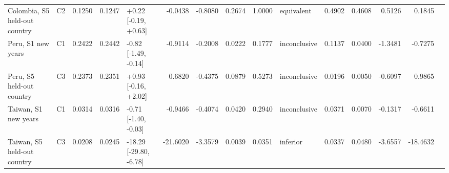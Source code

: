 \begin{tabular}{llrrlrrrrlrrrrr}
Colombia, S5 held-out country & C2 & 0.1250 & 0.1247 & +0.22 [-0.19, +0.63] & -0.0438 & -0.8080 & 0.2674 & 1.0000 & equivalent & 0.4902 & 0.4608 & 0.5126 & 0.1845 &  \\
Peru, S1 new years & C1 & 0.2422 & 0.2442 & -0.82 [-1.49, -0.14] & -0.9114 & -0.2008 & 0.0222 & 0.1777 & inconclusive & 0.1137 & 0.0400 & -1.3481 & -0.7275 &  \\
Peru, S5 held-out country & C3 & 0.2373 & 0.2351 & +0.93 [-0.16, +2.02] & 0.6820 & -0.4375 & 0.0879 & 0.5273 & inconclusive & 0.0196 & 0.0050 & -0.6097 & 0.9865 &  \\
Taiwan, S1 new years & C1 & 0.0314 & 0.0316 & -0.71 [-1.40, -0.03] & -0.9466 & -0.4074 & 0.0420 & 0.2940 & inconclusive & 0.0371 & 0.0070 & -0.1317 & -0.6611 &  \\
Taiwan, S5 held-out country & C3 & 0.0208 & 0.0245 & -18.29 [-29.80, -6.78] & -21.6020 & -3.3579 & 0.0039 & 0.0351 & inferior & 0.0337 & 0.0480 & -3.6557 & -18.4632 &  \\
\bottomrule
\end{tabular}
